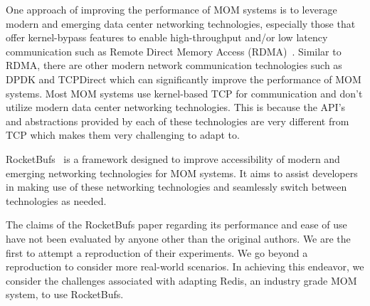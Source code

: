 \documentclass[letterpaper,twocolumn,10pt]{article}
\begin{document}
One approach of improving the performance of MOM systems is to leverage modern and emerging data center networking technologies, especially those that offer kernel-bypass features to enable high-throughput and/or low latency communication such as Remote Direct Memory Access (RDMA)~\cite{RDMAOverTCP}.
Similar to RDMA, there are other modern network communication technologies such as DPDK and TCPDirect which can significantly improve the performance of MOM systems. Most MOM systems use kernel-based TCP for communication and don't utilize modern data center networking technologies. This is because the API's and abstractions provided by each of these technologies are very different from TCP which makes them very challenging to adapt to.  

RocketBufs~\cite{Rocketbufs} is a framework designed to improve accessibility of modern and emerging networking technologies for MOM systems. It aims to assist developers in making use of these networking technologies and seamlessly switch between technologies as needed.

The claims of the RocketBufs paper regarding its performance and ease of use have not been evaluated by anyone other than the original authors.
We are the first to attempt a reproduction of their experiments.
We go beyond a reproduction to consider more real-world scenarios. In achieving this endeavor, we consider the challenges associated with adapting Redis, an industry grade MOM system, to use RocketBufs.

\end{document}
